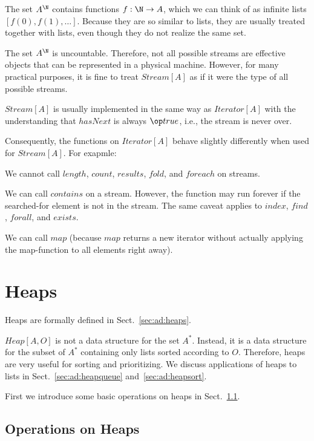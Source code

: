 The set $A^\N$ contains functions $f:\N\to A$, which we can think of as infinite lists $[f(0),f(1),\ldots]$.
Because they are so similar to lists, they are usually treated together with lists, even though they do not realize the same set.

The set $A^\N$ is uncountable.
Therefore, not all possible streams are effective objects that can be represented in a physical machine.
However, for many practical purposes, it is fine to treat $Stream[A]$ as if it were the type of all possible streams.

$Stream[A]$ is usually implemented in the same way as $Iterator[A]$ with the understanding that $hasNext$ is always $\true$, i.e., the stream is never over.

Consequently, the functions on $Iterator[A]$ behave slightly differently when used for $Stream[A]$.
For exapmle:
\begin{compactitem}
 \item We cannot call $length$, $count$, $results$, $fold$, and $foreach$ on streams.
 \item We can call $contains$ on a stream. However, the function may run forever if the searched-for element is not in the stream.
 The same caveat applies to $index$, $find$, $forall$, and $exists$.
 \item We can call $map$ (because $map$ returns a new iterator without actually applying the map-function to all elements right away).
\end{compactitem}

\section{Heaps}\label{sec:ad:heaplists}

Heaps are formally defined in Sect.~\ref{sec:ad:heaps}.

$Heap[A,O]$ is not a data structure for the set $A^*$.
Instead, it is a data structure for the subset of $A^*$ containing only lists sorted according to $O$.
Therefore, heaps are very useful for sorting and prioritizing.
We discuss applications of heaps to lists in Sect.~\ref{sec:ad:heapqueue} and~\ref{sec:ad:heapsort}.

First we introduce some basic operations on heaps in Sect.~\ref{sec:ad:heapops}.

\subsection{Operations on Heaps}\label{sec:ad:heapops}

